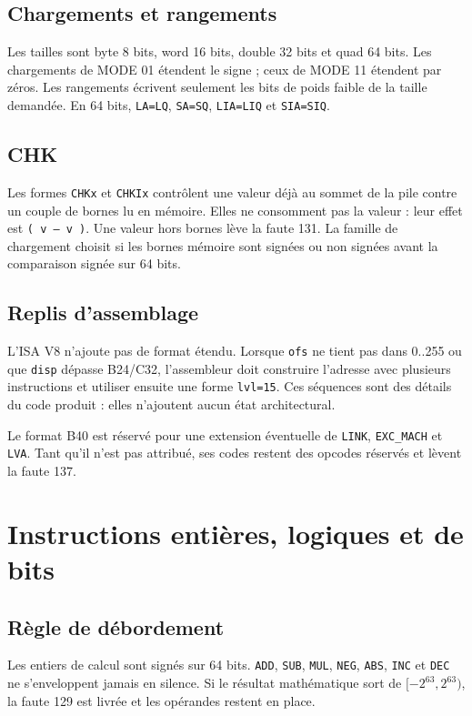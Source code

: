 \documentclass[10pt,a4paper,twoside,openany]{book}
\newcommand{\code}[1]{\texttt{#1}}
\newcommand{\stack}[1]{\texttt{#1}}
\begin{document}
\section{Chargements et rangements}
Les tailles sont byte 8 bits, word 16 bits, double 32 bits et quad 64 bits. Les chargements de MODE 01 étendent le signe ; ceux de MODE 11 étendent par zéros. Les rangements écrivent seulement les bits de poids faible de la taille demandée. En 64 bits, \texttt{LA=LQ}, \texttt{SA=SQ}, \texttt{LIA=LIQ} et \texttt{SIA=SIQ}.

\section{CHK}
Les formes \texttt{CHKx} et \texttt{CHKIx} contrôlent une valeur déjà au sommet de la pile contre un couple de bornes lu en mémoire. Elles ne consomment pas la valeur : leur effet est \stack{( v -- v )}. Une valeur hors bornes lève la faute 131. La famille de chargement choisit si les bornes mémoire sont signées ou non signées avant la comparaison signée sur 64 bits.

\section{Replis d'assemblage}
L'ISA V8 n'ajoute pas de format étendu. Lorsque \code{ofs} ne tient pas dans 0..255 ou que \code{disp} dépasse B24/C32, l'assembleur doit construire l'adresse avec plusieurs instructions et utiliser ensuite une forme \code{lvl=15}. Ces séquences sont des détails du code produit : elles n'ajoutent aucun état architectural.

Le format B40 est réservé pour une extension éventuelle de \texttt{LINK}, \texttt{EXC\_MACH} et \texttt{LVA}. Tant qu'il n'est pas attribué, ses codes restent des opcodes réservés et lèvent la faute 137.
\chapter{Instructions entières, logiques et de bits}
\section{Règle de débordement}
Les entiers de calcul sont signés sur 64 bits. \texttt{ADD}, \texttt{SUB}, \texttt{MUL}, \texttt{NEG}, \texttt{ABS}, \texttt{INC} et \texttt{DEC} ne s'enveloppent jamais en silence. Si le résultat mathématique sort de $[-2^{63},2^{63})$, la faute 129 est livrée et les opérandes restent en place.
\end{document}

